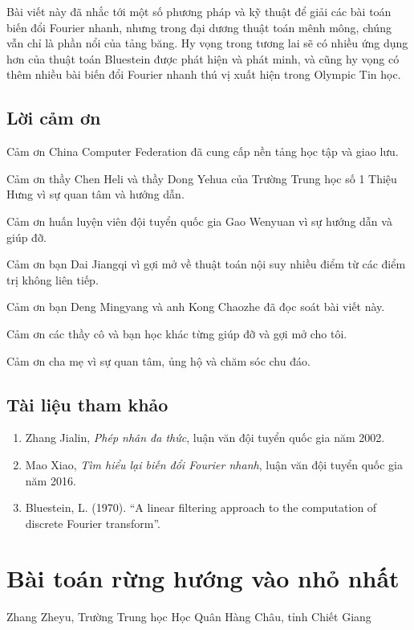 \documentclass[11pt]{article}
\begin{document}
Bài viết này đã nhắc tới một số phương pháp và kỹ thuật để giải các bài toán
biến đổi Fourier nhanh, nhưng trong đại dương thuật toán mênh mông, chúng vẫn
chỉ là phần nổi của tảng băng. Hy vọng trong tương lai sẽ có nhiều ứng dụng hơn
của thuật toán Bluestein được phát hiện và phát minh, và cũng hy vọng có thêm
nhiều bài biến đổi Fourier nhanh thú vị xuất hiện trong Olympic Tin học.

\subsection{Lời cảm ơn}

Cảm ơn China Computer Federation đã cung cấp nền tảng học tập và giao lưu.

Cảm ơn thầy Chen Heli và thầy Dong Yehua của Trường Trung học số 1 Thiệu Hưng
vì sự quan tâm và hướng dẫn.

Cảm ơn huấn luyện viên đội tuyển quốc gia Gao Wenyuan vì sự hướng dẫn và giúp
đỡ.

Cảm ơn bạn Dai Jiangqi vì gợi mở về thuật toán nội suy nhiều điểm từ các điểm
trị không liên tiếp.

Cảm ơn bạn Deng Mingyang và anh Kong Chaozhe đã đọc soát bài viết này.

Cảm ơn các thầy cô và bạn học khác từng giúp đỡ và gợi mở cho tôi.

Cảm ơn cha mẹ vì sự quan tâm, ủng hộ và chăm sóc chu đáo.

\subsection*{Tài liệu tham khảo}

\begin{enumerate}
  \item Zhang Jialin, \emph{Phép nhân đa thức}, luận văn đội tuyển quốc gia năm
  2002.
  \item Mao Xiao, \emph{Tìm hiểu lại biến đổi Fourier nhanh}, luận văn đội tuyển
  quốc gia năm 2016.
  \item Bluestein, L. (1970). ``A linear filtering approach to the computation
  of discrete Fourier transform''.
\end{enumerate}

\section{Bài toán rừng hướng vào nhỏ nhất}

\begin{center}
Zhang Zheyu, Trường Trung học Học Quân Hàng Châu, tỉnh Chiết Giang
\end{center}
\end{document}
